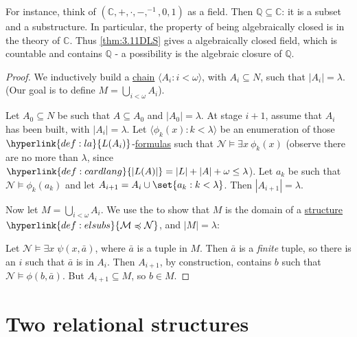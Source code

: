 \documentclass{article}
\let\models\vDash
\begin{document}
For instance, think of $(\mathbb{C}, + , \cdot, -, ^{-1}, 0,1)$ as a field.
Then $\mathbb{Q} \subseteq \mathbb{C}$: it is a subset and a substructure.
In particular, the property of being algebraically closed is in the theory of $\mathbb{C}$.
Thus \cref{thm:3.11DLS} gives a algebraically closed field, which is countable and contains $\mathbb{Q}$ - a possibility is the algebraic closure of $\mathbb{Q}$.

\begin{proof}
  We inductively build a \hyperlink{def:chain}{chain} $\langle A_i  : i < \omega \rangle$, with $A_i \subseteq N$, such that $|A_i| = \lambda$.
  (Our goal is to define $M = \bigcup_{i < \omega} A_i$).

  Let $A_0 \subseteq N$ be such that $A \subseteq A_0$ and $|A_0| = \lambda$.
  At stage $i+1$, assume that $A_i$ has been built, with $|A_i| = \lambda$.
  Let $\langle \phi_k(x) : k < \lambda  \rangle$ be an enumeration of those $\hyperlink{def:la}{L(A_i)}$-\hyperlink{def:form}{formulas} such that $\mathcal{N} \models \exists x \ \phi_k(x)$ (observe there are no more than $\lambda$, since $\hyperlink{def:cardlang}{|L(A)|} = |L| + |A| + \omega \leq \lambda$).
  Let $a_k$ be such that $\mathcal{N} \models \phi_k(a_k)$ and let $A_{i+1} = A_i \cup \set{a_k : k < \lambda}$.
  Then $|A_{i+1}| = \lambda$.

  Now let $M = \bigcup_{i < \omega} A_i$.
  We use the  to show that $M$ is the domain of a \hyperlink{def:str}{structure} $\hyperlink{def:elsubs}{\mathcal{M} \preccurlyeq \mathcal{N}}$, and $|M| = \lambda$:

  Let $\mathcal{N} \models \exists x \; \psi(x,\bar{a})$, where $\bar{a}$ is a tuple in $M$.
  Then $\bar{a}$ is a \emph{finite} tuple, so there is an $i$ such that $\bar{a}$ is in $A_i$.
  Then $A_{i+1}$, by construction, contains $b$ such that $\mathcal{N} \models \phi(b, \bar{a})$.
  But $A_{i+1} \subseteq M$, so $b \in M$.
\end{proof}

\clearpage
\section{Two relational structures}
\end{document}
